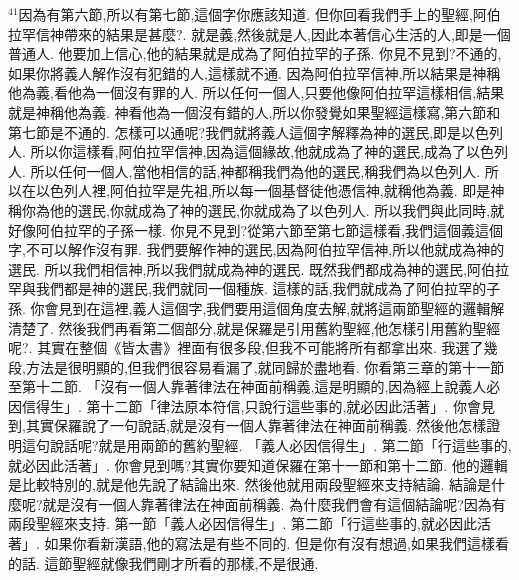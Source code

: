 \documentclass{book}
\begin{document}
$^{41}$因為有第六節,所以有第七節,這個字你應該知道.
但你回看我們手上的聖經,阿伯拉罕信神帶來的結果是甚麼?.
就是義,然後就是人,因此本著信心生活的人,即是一個普通人.
他要加上信心,他的結果就是成為了阿伯拉罕的子孫.
你見不見到?不通的,如果你將義人解作沒有犯錯的人,這樣就不通.
因為阿伯拉罕信神,所以結果是神稱他為義,看他為一個沒有罪的人.
所以任何一個人,只要他像阿伯拉罕這樣相信,結果就是神稱他為義.
神看他為一個沒有錯的人,所以你發覺如果聖經這樣寫,第六節和第七節是不通的.
怎樣可以通呢?我們就將義人這個字解釋為神的選民,即是以色列人.
所以你這樣看,阿伯拉罕信神,因為這個緣故,他就成為了神的選民,成為了以色列人.
所以任何一個人,當他相信的話,神都稱我們為他的選民,稱我們為以色列人.
所以在以色列人裡,阿伯拉罕是先祖,所以每一個基督徒他憑信神,就稱他為義.
即是神稱你為他的選民,你就成為了神的選民,你就成為了以色列人.
所以我們與此同時,就好像阿伯拉罕的子孫一樣.
你見不見到?從第六節至第七節這樣看,我們這個義這個字,不可以解作沒有罪.
我們要解作神的選民,因為阿伯拉罕信神,所以他就成為神的選民.
所以我們相信神,所以我們就成為神的選民.
既然我們都成為神的選民,阿伯拉罕與我們都是神的選民,我們就同一個種族.
這樣的話,我們就成為了阿伯拉罕的子孫.
你會見到在這裡,義人這個字,我們要用這個角度去解,就將這兩節聖經的邏輯解清楚了.
然後我們再看第二個部分,就是保羅是引用舊約聖經,他怎樣引用舊約聖經呢?.
其實在整個《皆太書》裡面有很多段,但我不可能將所有都拿出來.
我選了幾段,方法是很明顯的,但我們很容易看漏了,就同歸於盡地看.
你看第三章的第十一節至第十二節.
「沒有一個人靠著律法在神面前稱義,這是明顯的,因為經上說義人必因信得生」.
第十二節「律法原本符信,只說行這些事的,就必因此活著」.
你會見到,其實保羅說了一句說話,就是沒有一個人靠著律法在神面前稱義.
然後他怎樣證明這句說話呢?就是用兩節的舊約聖經.
「義人必因信得生」.
第二節「行這些事的,就必因此活著」.
你會見到嗎?其實你要知道保羅在第十一節和第十二節.
他的邏輯是比較特別的,就是他先說了結論出來.
然後他就用兩段聖經來支持結論.
結論是什麼呢?就是沒有一個人靠著律法在神面前稱義.
為什麼我們會有這個結論呢?因為有兩段聖經來支持.
第一節「義人必因信得生」.
第二節「行這些事的,就必因此活著」.
如果你看新漢語,他的寫法是有些不同的.
但是你有沒有想過,如果我們這樣看的話.
這節聖經就像我們剛才所看的那樣,不是很通.
\end{document}
